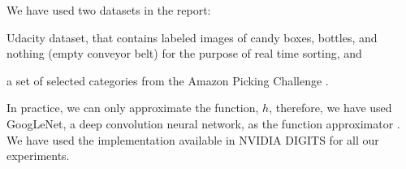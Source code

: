 \documentclass[10pt,journal,compsoc]{IEEEtran}
\begin{document}
We have used two datasets in the report: \begin{enumerate*}
\item Udacity dataset, that contains labeled images of candy boxes, bottles, and nothing (empty conveyor belt) for the purpose of real time sorting, and \item a set of selected categories from the Amazon Picking Challenge \cite{Singh2014BigBIRDAL}. 
\end{enumerate*} In practice, we can only approximate the function, $h$, therefore, we have used GoogLeNet, a deep convolution neural network, as the function approximator \cite{43022}. We have used the implementation available in NVIDIA DIGITS \cite{Erickson2017} for all our experiments.    
  
%
%
%
%
%
\end{document}
